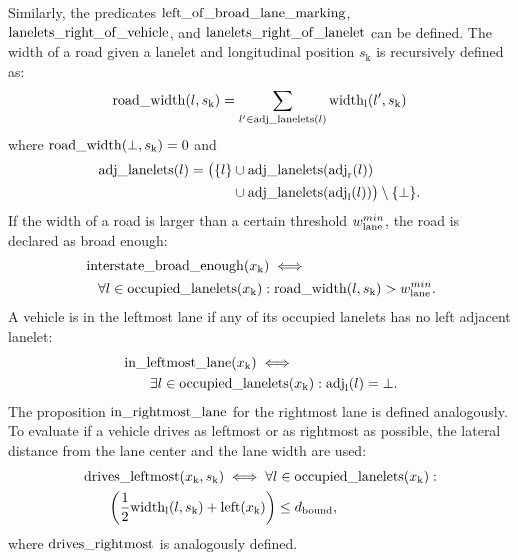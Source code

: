 Similarly, the predicates $\operatorname*{left\_of\_broad\_lane\_marking}$, $\operatorname*{lanelets\_right\_of\_vehicle}$, and $\operatorname*{lanelets\_right\_of\_lanelet}$ can be defined.
The width of a road given a lanelet and longitudinal position $s_\mathrm{k}$ is recursively defined as:
\begin{align*}
\begin{split}
\operatorname*{road\_width}(l, s_\mathrm{k}) = \sum_{l' \in \operatorname*{adj\_lanelets}(l)} \mathrm{width}_\mathrm{l}(l', s_\mathrm{k}) 
\end{split}
\end{align*} 
where $\operatorname*{road\_width}(\bot, s_\mathrm{k}) = 0$ and 
\begin{align*}
\begin{split}
\operatorname*{adj\_lanelets}(l) = \big(\{l\} &\cup \operatorname*{adj\_lanelets}(\mathrm{adj}_\mathrm{r}(l)) \\ 
& \cup \operatorname*{adj\_lanelets}(\mathrm{adj}_\mathrm{l}(l))\big) \setminus \{\bot\}.
\end{split}
\end{align*} 
If the width of a road is larger than a certain threshold $w_\text{lane}^{min}$, the road is declared as broad enough:
\begin{align*}
\begin{split}
& \operatorname*{interstate\_broad\_enough}(x_\text{k}) \iff  \\
& \quad \forall l \in \operatorname*{occupied\_lanelets}(x_\text{k}): \operatorname*{road\_width}(l, s_\mathrm{k}) > w_\text{lane}^{min}. \\  
\end{split}
\end{align*}
A vehicle is in the leftmost lane if any of its occupied lanelets has no left adjacent lanelet:
\begin{align*}
\begin{split}
& \operatorname*{in\_leftmost\_lane}(x_\text{k}) \iff \\ 
& \qquad \exists l \in \operatorname*{occupied\_lanelets}(x_\text{k}): \mathrm{adj}_\mathrm{l}(l) = \bot.
\end{split}
\end{align*} 
The proposition $\operatorname*{in\_rightmost\_lane}$ for the rightmost lane is defined analogously.
To evaluate if a vehicle drives as leftmost or as rightmost as possible, the lateral distance from the lane center and the lane width are used:
\begin{align*}
\begin{split}
& \operatorname*{drives\_leftmost}(x_\text{k}, s_\mathrm{k}) \iff \forall l \in \operatorname*{occupied\_lanelets}(x_\text{k}): \\ 
& \qquad \bigg(\frac{1}{2} \mathrm{width}_\mathrm{l}(l, s_\mathrm{k}) + \operatorname*{left}(x_\text{k})\bigg) \leq d_\text{bound},
\end{split}
\end{align*}
where $\operatorname*{drives\_rightmost}$ is analogously defined.


